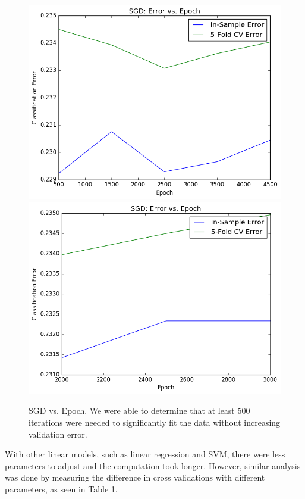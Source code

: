\begin{itemize}
\begin{itemize}
\begin{figure}[H]
\includegraphics[scale=0.25]{sgd-vs-epoch3}
\includegraphics[scale=0.25]{sgd-vs-epoch4}
\caption{SGD vs. Epoch. We were able to determine that at least 500 iterations were needed to significantly fit the data without increasing validation error.}
\end{figure}
With other linear models, such as linear regression and SVM, there were less parameters to adjust and the computation took longer. However, similar analysis was done by measuring the difference in cross validations with different parameters, as seen in Table 1.
\end{itemize}

\end{itemize}



